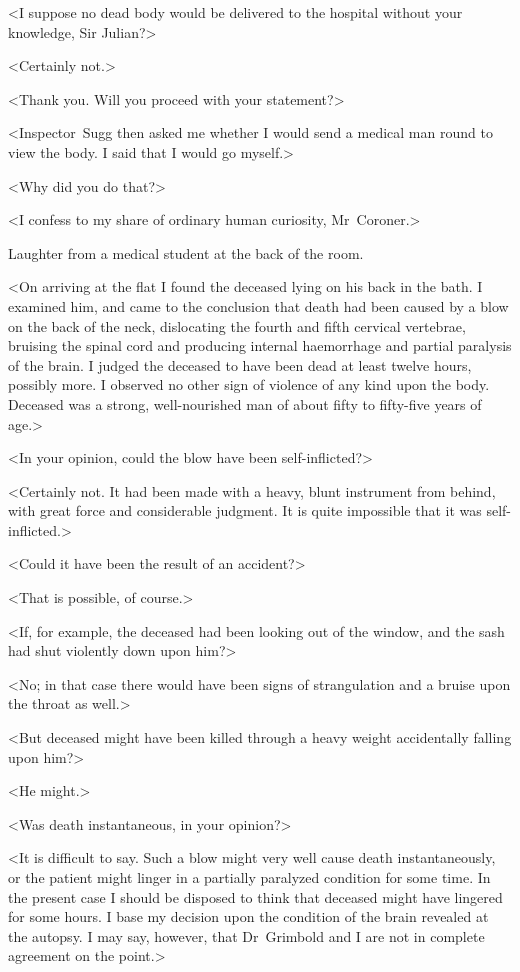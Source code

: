 <I suppose no dead body would be delivered to the hospital without your knowledge, Sir Julian?>

<Certainly not.>

<Thank you. Will you proceed with your statement?>

<Inspector~Sugg then asked me whether I would send a medical man round to view the body. I said that I would go myself.>

<Why did you do that?>

<I confess to my share of ordinary human curiosity, Mr~Coroner.>

Laughter from a medical student at the back of the room.

<On arriving at the flat I found the deceased lying on his back in the bath. I examined him, and came to the conclusion that death had been caused by a blow on the back of the neck, dislocating the fourth and fifth cervical vertebrae, bruising the spinal cord and producing internal haemorrhage and partial paralysis of the brain. I judged the deceased to have been dead at least twelve hours, possibly more. I observed no other sign of violence of any kind upon the body. Deceased was a strong, well-nourished man of about fifty to fifty-five years of age.>

<In your opinion, could the blow have been self-inflicted?>

<Certainly not. It had been made with a heavy, blunt instrument from behind, with great force and considerable judgment. It is quite impossible that it was self-inflicted.>

<Could it have been the result of an accident?>

<That is possible, of course.>

<If, for example, the deceased had been looking out of the window, and the sash had shut violently down upon him?>

<No; in that case there would have been signs of strangulation and a bruise upon the throat as well.>

<But deceased might have been killed through a heavy weight accidentally falling upon him?>

<He might.>

<Was death instantaneous, in your opinion?>

<It is difficult to say. Such a blow might very well cause death instantaneously, or the patient might linger in a partially paralyzed condition for some time. In the present case I should be disposed to think that deceased might have lingered for some hours. I base my decision upon the condition of the brain revealed at the autopsy. I may say, however, that Dr~Grimbold and I are not in complete agreement on the point.>

